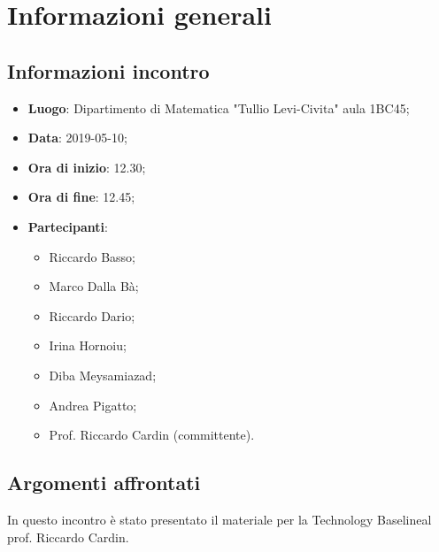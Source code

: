 \section{Informazioni generali}

\subsection{Informazioni incontro}
\begin{itemize}
	\item \textbf{Luogo}: Dipartimento di Matematica "Tullio Levi-Civita" aula 1BC45;
	\item \textbf{Data}: 2019-05-10;
	\item \textbf{Ora di inizio}: 12.30;
	\item \textbf{Ora di fine}: 12.45;
	\item \textbf{Partecipanti}: 
	\begin{itemize}
		\item Riccardo Basso;
		\item Marco Dalla Bà;
		\item Riccardo Dario;
		\item Irina Hornoiu;
		\item Diba Meysamiazad;
		\item Andrea Pigatto;
		\item Prof. Riccardo Cardin (committente).	
	\end{itemize}
\end{itemize}

\subsection{Argomenti affrontati}
In questo incontro è stato presentato il materiale per la Technology Baseline\glosp al prof. Riccardo Cardin. 